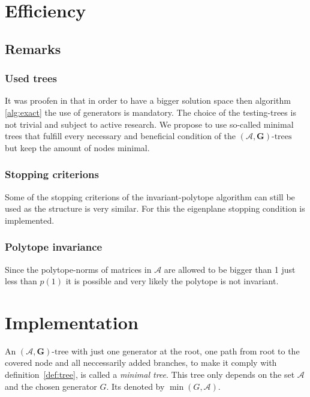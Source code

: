 \section{Efficiency}

\subsection*{Remarks}
\subsubsection*{Used trees}
It was proofen in \citep{mollerTreebasedApproachJoint2014} that in order to have a bigger solution space then algorithm \ref{alg:exact} the use of generators is mandatory. 
The choice of the testing-trees is not trivial and subject to active research. 
We propose to use so-called minimal trees that fulfill every necessary and beneficial condition of the $(\mathcal{A},\mathbf{G})\text{-trees}$ but keep the amount of nodes minimal.

\subsubsection*{Stopping criterions}
Some of the stopping criterions of the invariant-polytope algorithm can still be used as the structure is very similar. 
For this the eigenplane stopping condition is implemented. 

\subsubsection*{Polytope invariance}
Since the polytope-norms of matrices in $\mathcal{A}$ are allowed to be bigger than 1 just less than $p(1)$ it is possible and very likely the polytope is not invariant.

\section{Implementation}

\begin{definition}
  An $(\mathcal{A},\mathbf{G})\text{-tree}$ with just one generator at the root, one path from root to the covered node and all neccessarily added branches, to make it comply with definition~\ref{def:tree}, is called a \emph{minimal tree}. This tree only depends on the set $\mathcal{A}$ and the chosen generator $G$. Its denoted by $\min(G, \mathcal{A})$.
\end{definition}

